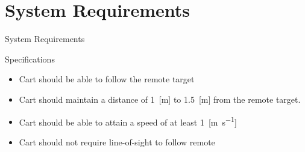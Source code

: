 \documentclass{beamer}
\begin{document}





\section{System Requirements}
\begin{frame}{System Requirements}
  \begin{block}{Specifications}
    \begin{itemize}
      \item Cart should be able to follow the remote target
      \item Cart should maintain a distance of 1~[\si{\meter}] to 1.5~[\si{\meter}] from the remote target.
      \item Cart should be able to attain a speed of at least 1~[\si{\meter\per\second}]
      \item Cart should not require line-of-sight to follow remote
     \end{itemize}
  \end{block}
\end{frame}
\end{document}
